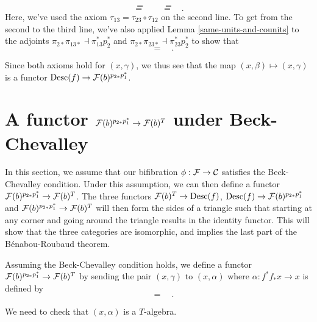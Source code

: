 \documentclass{amsart}
\begin{document}
    \[
        =\quad 
        \quad=\quad
        
    \]
    \[
        =\quad
        \quad=\quad
        
        .
    \]
    Here, we've used the axiom $\tau_{13}=\tau_{23}\circ \tau_{12}$
        on the second line.
    To get from the second to the third line, we've also applied Lemma \ref{same-units-and-counits}
        to the adjoints $\pi_{2\ast}\pi_{13\ast}\dashv\pi_{13}^\ast p_2^\ast$ 
        and $\pi_{2\ast}\pi_{23\ast}\dashv\pi_{23}^\ast p_2^\ast$ to show that
    \[
        
        \quad=\quad
        
        .
    \]

    Since both axioms hold for $(x,\gamma)$, we thus see that the map
        $(x,\beta)\mapsto (x,\gamma)$ is a functor $\operatorname{Desc}(f)\to \mathcal F(b)^{p_{2\ast}p_1^\ast}$.
\section{A functor $\mathcal F(b)^{p_{2\ast}p_1^\ast}\to \mathcal F(b)^T$ under Beck-Chevalley}
    In this section, we assume that our bifibration $\phi:\mathcal F\to \mathcal C$
        satisfies the Beck-Chevalley condition.
    Under this assumption, we can then define a functor $\mathcal F(b)^{p_{2\ast}p_1^\ast}\to \mathcal
        F(b)^T$.
    The three functors $\mathcal F(b)^T\to \operatorname{Desc}(f)$, $\operatorname{Desc}(f)\to \mathcal F(b)^{p_{2\ast}p_1^\ast}$
        and $\mathcal F(b)^{p_{2\ast}p_1^\ast}\to \mathcal F(b)^T$ will then form the sides of a triangle such that starting
        at any corner and going around the triangle results in the identity functor.
    This will show that the three categories are isomorphic, and implies the last part of the
        B\'enabou-Roubaud theorem.
    \begin{definition}
        Assuming the Beck-Chevalley condition holds, we define a functor $\mathcal F(b)^{p_{2\ast}p_1^\ast}\to \mathcal F(b)^T$
            by sending the pair $(x,\gamma)$ to $(x,\alpha)$ where 
            $\alpha:f^\ast f_\ast x\to x$ is defined by 
        \[
            
            \quad=\quad
            
            .
        \]
    \end{definition}
    We need to check that $(x,\alpha)$ is a $T$-algebra.
\end{document}
